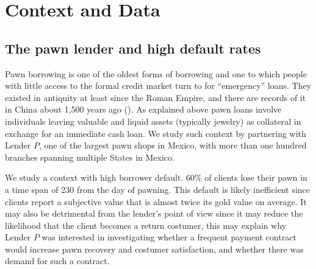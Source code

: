 \documentclass[oneside,11pt]{article}
\begin{document}


\section{Context and Data} \label{context}

\subsection{The pawn lender and high default rates}
    
Pawn borrowing is one of the oldest forms of borrowing and one to which people with little access to the formal credit market turn to for ``emergency'' loans. They existed in antiquity at least since the Roman Empire, and there are records of it in China about 1,500 years ago (\cite{PawnShops}). As explained above pawn loans involve individuals leaving valuable and liquid assets (typically jewelry) as collateral in exchange for an immediate cash loan. We study such  context by partnering with Lender $P$, one of the largest pawn shops in Mexico, with more than one hundred branches spanning multiple States in Mexico. 

We study a context with high borrower default. 60\% of clients lose their pawn in a time span of 230 from the day of pawning. This default is likely inefficient since clients report a subjective value that is almost twice its gold value on average. It may also be detrimental from the lender's point of view since it may reduce the likelihood that the client becomes a return costumer, this may explain why Lender $P$ was interested in investigating whether a frequent payment contract would increase pawn recovery and costumer satisfaction, and whether there was demand for such a contract. 
\end{document}
